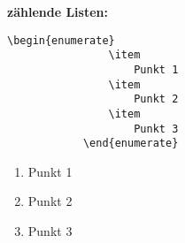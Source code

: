 \documentclass["WS\space 16-17\space -\space LaTeX-Kurs\space -\space Praesentation\space -\space 2.tex"]{subfiles}
\begin{document}
\begin{frame}[fragile]
    \textbf{\large{zählende Listen:}}\newline
    \Code*
        \begin{lstlisting}[gobble=12]
            \begin{enumerate}
                \item
                    Punkt 1
                \item
                    Punkt 2
                \item
                    Punkt 3
            \end{enumerate}
        \end{lstlisting}
    \Ausgabe
        \begin{outputbox}
            \begin{enumerate}
                \item
                    Punkt 1
                \item
                    Punkt 2
                \item
                    Punkt 3
            \end{enumerate}
        \end{outputbox}
\end{frame}
\end{document}
